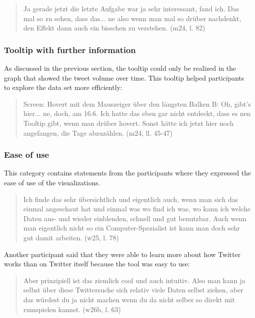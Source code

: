\begin{quote}
    Ja gerade jetzt die letzte Aufgabe war ja sehr interessant, fand ich. Das mal so zu sehen, dass das... ne also wenn man mal so drüber nachdenkt, den Effekt dann auch ein bisschen zu verstehen. (m24, l. 82)
\end{quote}

\subsubsection*{Tooltip with further information}
As discussed in the previous section, the tooltip could only be realized in the graph that showed the tweet volume over time. This tooltip helped participants to explore the data set more efficiently:

\begin{quote}
    Screen: Hovert mit dem Mauszeiger über den längsten Balken
    B: Oh, gibt's hier... ne, doch, am 16.6. Ich hatte das eben gar nicht entdeckt, dass es nen Tooltip gibt, wenn man drüber hovert. Sonst hätte ich jetzt hier noch angefangen, die Tage abzuzählen. (m24, ll. 45-47)
\end{quote}

\subsubsection*{Ease of use}
This category contains statements from the participants where they expressed the ease of use of the visualizations.

\begin{quote}
    Ich finde das sehr übersichtlich und eigentlich auch, wenn man sich das einmal angeschaut hat und einmal was wo find ich was, wo kann ich welche Daten aus- und wieder einblenden, schnell und gut benutzbar. Auch wenn man eigentlich nicht so ein Computer-Spezialist ist kann man doch sehr gut damit arbeiten. (w25, l. 78)
\end{quote}

Another participant said that they were able to learn more about how Twitter works than on Twitter itself because the tool was easy to use:

\begin{quote}
    Aber prinzipiell ist das ziemlich cool und auch intuitiv. Also man kann ja selbst über diese Twittersuche sich relativ viele Daten selbst ziehen, aber das würdest du ja nicht machen wenn du da nicht selber so direkt mit rumspielen kannst. (w26b, l. 63)
\end{quote}

